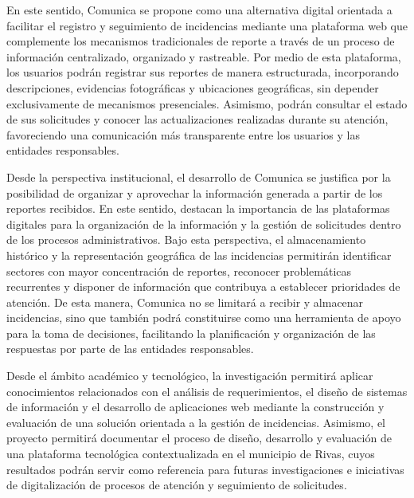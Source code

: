 En este sentido, Comunica se propone como una alternativa digital orientada a facilitar el registro y seguimiento de incidencias mediante una plataforma web que complemente los mecanismos tradicionales de reporte a través de un proceso de información centralizado, organizado y rastreable. Por medio de esta plataforma, los usuarios podrán registrar sus reportes de manera estructurada, incorporando descripciones, evidencias fotográficas y ubicaciones geográficas, sin depender exclusivamente de mecanismos presenciales. Asimismo, podrán consultar el estado de sus solicitudes y conocer las actualizaciones realizadas durante su atención, favoreciendo una comunicación más transparente entre los usuarios y las entidades responsables.

Desde la perspectiva institucional, el desarrollo de Comunica se justifica por la posibilidad de organizar y aprovechar la información generada a partir de los reportes recibidos. En este sentido, \textcite{moreno2026diseno} destacan la importancia de las plataformas digitales para la organización de la información y la gestión de solicitudes dentro de los procesos administrativos. Bajo esta perspectiva, el almacenamiento histórico y la representación geográfica de las incidencias permitirán identificar sectores con mayor concentración de reportes, reconocer problemáticas recurrentes y disponer de información que contribuya a establecer prioridades de atención. De esta manera, Comunica no se limitará a recibir y almacenar incidencias, sino que también podrá constituirse como una herramienta de apoyo para la toma de decisiones, facilitando la planificación y organización de las respuestas por parte de las entidades responsables.

Desde el ámbito académico y tecnológico, la investigación permitirá aplicar conocimientos relacionados con el análisis de requerimientos, el diseño de sistemas de información y el desarrollo de aplicaciones web mediante la construcción y evaluación de una solución orientada a la gestión de incidencias. Asimismo, el proyecto permitirá documentar el proceso de diseño, desarrollo y evaluación de una plataforma tecnológica contextualizada en el municipio de Rivas, cuyos resultados podrán servir como referencia para futuras investigaciones e iniciativas de digitalización de procesos de atención y seguimiento de solicitudes.

